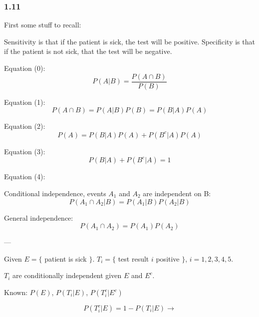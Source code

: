 \documentclass{article}
\begin{document}
\subsubsection*{1.11}

First some stuff to recall: 

 Sensitivity is that if the patient is sick, the test will be positive. Specificity is that if the patient is not sick, that the test will be negative.
 
Equation (0): $$P(A|B) = \frac{P(A \cap B)}{P(B)}$$ 

Equation (1): $$P(A \cap B) = P(A|B) P(B) = P(B|A) P(A)$$

Equation (2): $$P(A) = P(B|A) P(A) + P(B^c|A) P(A) $$

Equation (3): $$ P(B|A) +P(B^c|A) = 1 $$

Equation (4): 

Conditional independence, events $A_1$ and $A_2$ are independent on B: $$ P(A_1 \cap A_2 | B) = P(A_1 | B) P(A_2 |B) $$

General independence: $$P(A_1 \cap A_2) = P(A_1) P(A_2)$$

---

Given $E = \{$ patient is sick $\}$. $T_i = \{$ test result $i$ positive $\}$, $i=1,2,3,4,5$.

$T_i$ are conditionally independent given $E$ and $E^c$.

Known: $P(E)$, $P(T_i|E)$, $P(T_i^c|E^c)$

$$P(T_i^c|E) = 1-P(T_i|E) \rightarrow $$
\end{document}
